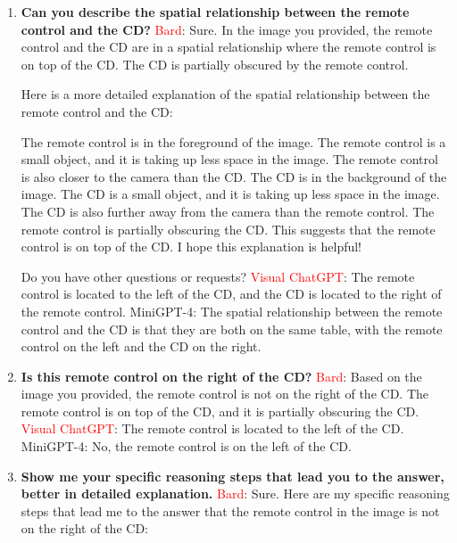 \begin{enumerate}
    \item \textbf{Can you describe the spatial relationship between the remote control and the CD?}
    \subitem \textcolor{Red}{Bard}: 
    Sure. In the image you provided, the remote control and the CD are in a spatial relationship where the remote control is on top of the CD. The CD is partially obscured by the remote control.
    
    Here is a more detailed explanation of the spatial relationship between the remote control and the CD:
    
    The remote control is in the foreground of the image. The remote control is a small object, and it is taking up less space in the image. The remote control is also closer to the camera than the CD.
    The CD is in the background of the image. The CD is a small object, and it is taking up less space in the image. The CD is also further away from the camera than the remote control.
    The remote control is partially obscuring the CD. This suggests that the remote control is on top of the CD.
    I hope this explanation is helpful!
    
    Do you have other questions or requests?
    \subitem \textcolor{red}{Visual ChatGPT}: The remote control is located to the left of the CD, and the CD is located to the right of the remote control.
    \subitem MiniGPT-4: The spatial relationship between the remote control and the CD is that they are both on the same table, with the remote control on the left and the CD on the right.
    \item \textbf{Is this remote control on the right of the CD?}
    \subitem \textcolor{Red}{Bard}: Based on the image you provided, the remote control is not on the right of the CD. The remote control is on top of the CD, and it is partially obscuring the CD.
    \subitem \textcolor{red}{Visual ChatGPT}: The remote control is located to the left of the CD.
    \subitem MiniGPT-4: No, the remote control is on the left of the CD.
    \item \textbf{Show me your specific reasoning steps that lead you to the answer, better in detailed explanation.}
    \subitem \textcolor{Red}{Bard}: 
    Sure. Here are my specific reasoning steps that lead me to the answer that the remote control in the image is not on the right of the CD:
    

\end{enumerate}
